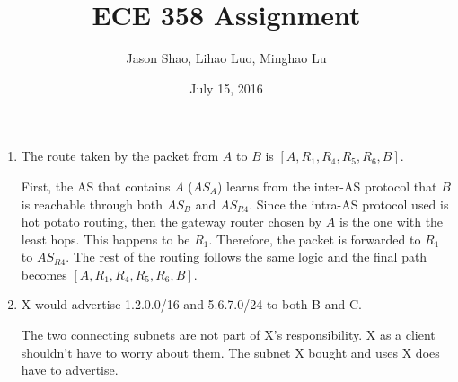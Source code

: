 \documentclass[12pt]{article}
\title{ECE 358 Assignment }
\author{Jason Shao, Lihao Luo, Minghao Lu}
\date{July 15, 2016}
\begin{document}
\maketitle
\renewcommand{\thesubsection}{Problem \arabic{subsection}}


\def\question#1{\item[\bf #1.]}
\def\part#1{\item[\bf #1)]}
\newcommand{\pc}[1]{\mbox{\textbf{#1}}} %

\begin{enumerate}
\item The route taken by the packet from $A$ to $B$ is $[A, R_1, R_4, R_5, R_6, B]$. 

First, the AS that contains $A$ ($AS_A$) learns from the inter-AS protocol that $B$ is reachable through both $AS_B$ and $AS_{R4}$. Since the intra-AS protocol used is hot potato routing, then the gateway router chosen by $A$ is the one with the least hops. This happens to be $R_1$. Therefore, the packet is forwarded to $R_1$ to $AS_{R4}$. The rest of the routing follows the same logic and the final path becomes $[A, R_1, R_4, R_5, R_6, B]$.

\item X would advertise 1.2.0.0/16 and 5.6.7.0/24 to both B and C.

The two connecting subnets are not part of X's responsibility. X as
a client shouldn't have to worry about them. The subnet X bought and uses X does have to advertise.

\end{enumerate}
\end{document}
